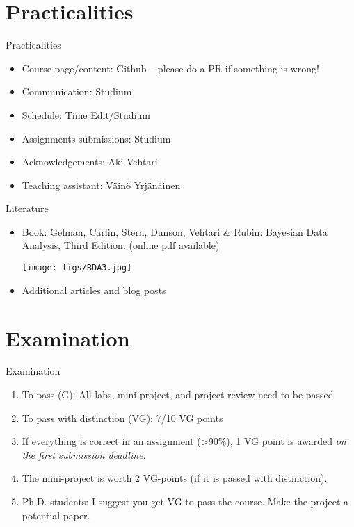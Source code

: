 \documentclass[10pt]{beamer}
\begin{document}
\section{Practicalities}
\frame{\sectionpage}

\begin{frame}{Practicalities}

\begin{itemize}
\item Course page/content: Github -- please do a PR if something is wrong!\pause
\item Communication: Studium\pause
\item Schedule: Time Edit/Studium
\item Assignments submissions: Studium\pause
\item Acknowledgements: Aki Vehtari\pause
\item Teaching assistant: Väinö Yrjänäinen
\end{itemize}

\end{frame}

\begin{frame}{Literature}

\begin{itemize}
  \item Book: Gelman, Carlin, Stern, Dunson, Vehtari \& Rubin: Bayesian Data Analysis, Third Edition. {\footnotesize (online pdf available)}
  \begin{center}
    \texttt{[image: figs/BDA3.jpg]}
  \end{center}
  \item Additional articles and blog posts
\end{itemize}

\end{frame}

\section{Examination}
\frame{\sectionpage}


\begin{frame}{Examination}

\begin{enumerate}
\item To pass (G): All labs, mini-project, and project review need to be passed\pause
\item To pass with distinction (VG): 7/10 VG points\pause
\item If everything is correct in an assignment (>90\%), 1 VG point is awarded \emph{on the first submission deadline}.\pause
\item The mini-project is worth 2 VG-points (if it is passed with distinction).
\item Ph.D. students: I suggest you get VG to pass the course. Make the project a potential paper.
\end{enumerate}

\end{frame}
\end{document}

